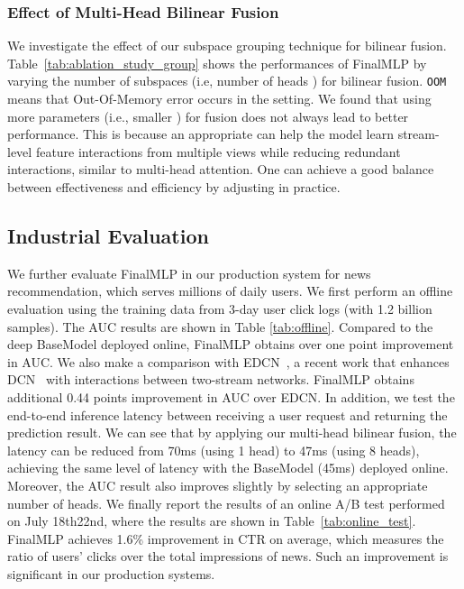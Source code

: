 \documentclass[letterpaper]{article} \usepackage{aaai23}  \usepackage{times}  \usepackage{helvet}  \usepackage{courier}  \usepackage[hyphens]{url}  \usepackage{graphicx} \urlstyle{rm} \def\UrlFont{\rm}  \usepackage{natbib}  \usepackage{caption} \frenchspacing  \setlength{\pdfpagewidth}{8.5in}  \setlength{\pdfpageheight}{11in}  \usepackage{algorithm}
\begin{document}
\subsubsection{Effect of Multi-Head Bilinear Fusion}
We investigate the effect of our subspace grouping technique for bilinear fusion. 
Table~\ref{tab:ablation_study_group} shows the performances of FinalMLP by varying the number of subspaces (i.e, number of heads ) for bilinear fusion. \texttt{OOM} means that Out-Of-Memory error occurs in the setting. We found that using more parameters (i.e., smaller ) for fusion does not always lead to better performance. This is because an appropriate  can help the model learn stream-level feature interactions from multiple views while reducing redundant interactions, similar to multi-head attention. One can achieve a good balance between effectiveness and efficiency by adjusting  in practice.


\subsection{Industrial Evaluation}
We further evaluate FinalMLP in our production system for news recommendation, which serves millions of daily users. We first perform an offline evaluation using the training data from 3-day user click logs (with 1.2 billion samples). The AUC results are shown in Table \ref{tab:offline}. Compared to the deep BaseModel deployed online, FinalMLP obtains over one point improvement in AUC. We also make a comparison with EDCN~\cite{EDCN}, a recent work that enhances DCN~\cite{DCN} with interactions between two-stream networks. FinalMLP obtains additional 0.44 points improvement in AUC over EDCN. 
In addition, we test the end-to-end inference latency between receiving a user request and returning the prediction result. We can see that by applying our multi-head bilinear fusion, the latency can be reduced from 70ms (using 1 head) to 47ms (using 8 heads), achieving the same level of latency with the BaseModel (45ms) deployed online. Moreover, the AUC result also improves slightly by selecting an appropriate number of heads. We finally report the results of an online A/B test performed on July 18th22nd, where the  results are shown in Table~\ref{tab:online_test}. FinalMLP achieves 1.6\% improvement in CTR on average, which measures the ratio of users' clicks over the total impressions of news. Such an improvement is significant in our production systems.
\end{document}
